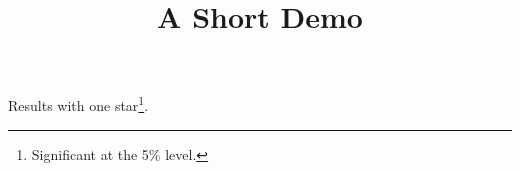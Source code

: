 \documentclass[article]{jss}
\title{A Short Demo}
\begin{document}
\begin{table}
Results with one star\footnote{Significant at the 5\% level.}.
\caption{\label{tab:x} Results.}
\end{table}
\end{document}

